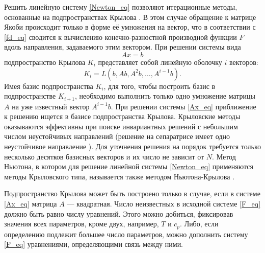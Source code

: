 Решить линейную систему \eqref{Newton_eq} позволяют итерационные методы, основанные на подпространствах Крылова \cite{Sanchez2004}. В этом случае обращение к матрице Якоби происходит только в форме её умножения на вектор, что в соответствии с \eqref{fd_eq} сводится к вычислению конечно-разностной производной функции $F$ вдоль направления, задаваемого этим вектором. При решении системы вида
\begin{equation}\label{Ax_eq}
Ax = b
\end{equation}
подпространство Крылова $K_i$ представляет собой линейную оболочку $i$ векторов:
\begin{equation}\label{Ki_eq}
K_i = L(b, Ab, A^2b, \dots, A^{i-1}b).
\end{equation}
Имея базис подпространства $K_i$, для того, чтобы построить базис в подпространстве $K_{i+1}$, необходимо выполнить только одно умножение матрицы $A$ на уже известный вектор $A^{i-1}b$. При решении системы \eqref{Ax_eq} приближение к решению ищется в базисе подпространства Крылова. Крыловские методы оказываются эффективны при поиске инвариантных решений с небольшим числом неустойчивых направлений (решение на сепаратрисе имеет одно неустойчивое направление \cite{Avila2013}). Для уточнения решения на порядок требуется только несколько десятков базисных векторов и их число не зависит от $N$. Метод Ньютона, в котором для решение линейной системы \eqref{Newton_eq} применяются методы Крыловского типа, называется также методом Ньютона-Крылова \cite{Sanchez2004}. 

Подпространство Крылова может быть построено только в случае, если в системе \eqref{Ax_eq} матрица $A$ --- квадратная. Число неизвестных в исходной системе \eqref{F_eq} должно быть равно числу уравнений. Этого можно добиться, фиксировав значения всех параметров, кроме двух, например, $T$ и $c_p$. Либо, если определению подлежит большее число параметров, можно дополнить систему \eqref{F_eq} уравнениями, определяющими связь между ними. 

